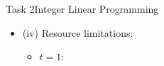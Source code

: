 \begin{frame}[allowframebreaks]{Task 2}{Integer Linear Programming}
  \begin{solutionnoinc}
    \begin{itemize}
      \item \alert{(iv) Resource limitations:}
      \begin{itemize}
         \item $t=1$:

\end{itemize}
\end{itemize}
\end{solutionnoinc}
\end{frame}
